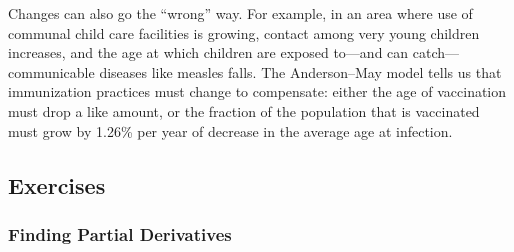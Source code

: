 Changes can also go the ``wrong'' way.  For example, in an area where
use of communal child care facilities is growing, contact among very
young children increases, and the age at which children are exposed
to---and can catch---communicable diseases like measles falls.  The
Anderson--May model tells us that immunization practices must change to
compensate: either the age of vaccination must drop a like amount, or
the fraction of the population that is vaccinated must grow by 1.26\%
per year of decrease in the average age at infection.

\subsection{Exercises}
\label{subsec:exercises}

\subsubsection{Finding Partial Derivatives}
\label{subsubsec:finding-partial-derivatives}




